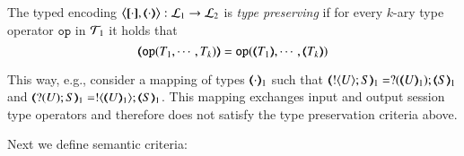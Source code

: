 \begin{definition}
	\label{def:tp}
	The typed encoding 
	$\enco{\map{\cdot}, \mapt{\cdot}}: \tyl{L}_1 \to \tyl{L}_2$ is \emph{type preserving}
	if for every $k$-ary type operator $\mathtt{op}$ in ${\cal{T}}_1$ it holds that 
	 $$\mapt{\mathtt{op}(T_1, \cdots, T_k)} = \mathtt{op}(\mapt{T_1}, \cdots, \mapt{T_k})$$
	\end{definition}
This way, e.g., 
consider a mapping of types $(\!\!\langle\cdot\rangle\!\!)_1$ such that 
$\mapt{\btout{U} S}_1 = \btinp{\mapt{U}_1} \mapt{S}_1$ 
and 
$\mapt{\btinp{U} S}_1 = \btout{\mapt{U}_1} \mapt{S}_1$. This mapping exchanges
input and output session type operators and therefore does not
satisfy the type preservation criteria above. %

Next we define semantic criteria: %


